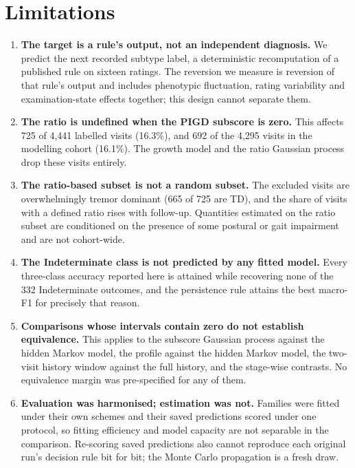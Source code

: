 \documentclass[11pt]{article}
\begin{document}
\section{Limitations}
\label{sec:limits}

\begin{enumerate}
\itemsep3pt
\item \textbf{The target is a rule's output, not an independent diagnosis.} We
predict the next recorded subtype label, a deterministic recomputation of a
published rule on sixteen ratings. The reversion we measure is reversion of that
rule's output and includes phenotypic fluctuation, rating variability and
examination-state effects together; this design cannot separate them.

\item \textbf{The ratio is undefined when the PIGD subscore is zero.} This affects
725 of 4,441 labelled visits (16.3\%), and 692 of the 4,295 visits in the
modelling cohort (16.1\%). The growth model and the ratio Gaussian process drop
these visits entirely.

\item \textbf{The ratio-based subset is not a random subset.} The excluded visits
are overwhelmingly tremor dominant (665 of 725 are TD), and the share of visits
with a defined ratio rises with follow-up. Quantities estimated on the ratio
subset are conditioned on the presence of some postural or gait impairment and are
not cohort-wide.

\item \textbf{The Indeterminate class is not predicted by any fitted model.} Every
three-class accuracy reported here is attained while recovering none of the 332
Indeterminate outcomes, and the persistence rule attains the best macro-F1 for
precisely that reason.

\item \textbf{Comparisons whose intervals contain zero do not establish
equivalence.} This applies to the subscore Gaussian process against the hidden
Markov model, the profile against the hidden Markov model, the two-visit history
window against the full history, and the stage-wise contrasts. No equivalence
margin was pre-specified for any of them.

\item \textbf{Evaluation was harmonised; estimation was not.} Families were fitted
under their own schemes and their saved predictions scored under one protocol, so
fitting efficiency and model capacity are not separable in the comparison.
Re-scoring saved predictions also cannot reproduce each original run's decision
rule bit for bit; the Monte Carlo propagation is a fresh draw.


\end{enumerate}
\end{document}
